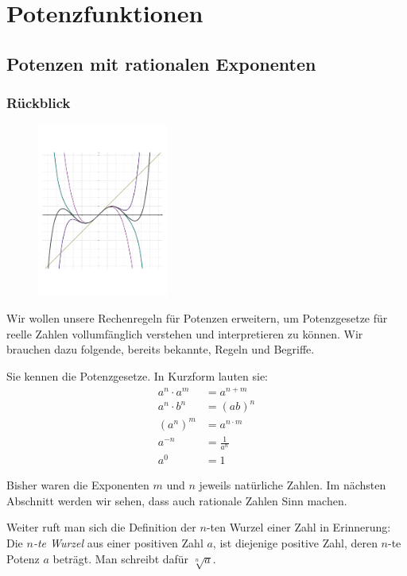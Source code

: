 \documentclass[%
11pt,%
twoside,%
titlepage,%
german,%
headsepline%
]{scrartcl}
\begin{document}
\clearpage
 
\section{Potenzfunktionen}
  
\subsection{Potenzen mit rationalen Exponenten}
\subsubsection{Rückblick}
  \begin{figure}
  \begin{center}
    \includegraphics[width=0.382\textwidth]{pictures/title}
  \end{center}
\end{figure}
Wir wollen unsere Rechenregeln für Potenzen erweitern, um Potenzgesetze
für reelle Zahlen vollumfänglich verstehen und interpretieren zu können.
Wir brauchen dazu folgende, bereits bekannte, Regeln und Begriffe.
\begin{erin}
  Sie
  kennen die Potenzgesetze. In Kurzform lauten sie:
\begin{align}
  a^n\cdot a^m&=a^{n+m}\\
  a^n\cdot b^n&=(ab)^n\\
  \left(a^n\right)^m&=a^{n\cdot m}\\
  a^{-n}&=\frac{1}{a^n}\\
  a^0&=1
\end{align}

Bisher waren die Exponenten $m$ und $n$ jeweils natürliche Zahlen. Im
nächsten Abschnitt werden wir sehen, dass auch rationale Zahlen Sinn
machen.

Weiter ruft man sich die Definition der $n$-ten Wurzel einer Zahl
in Erinnerung: Die \emph{$n$-te Wurzel} aus einer positiven Zahl
$a$, ist diejenige positive Zahl, deren $n$-te Potenz $a$ beträgt.
Man schreibt dafür $\sqrt[n]{a}$.
\end{erin}
\end{document}
